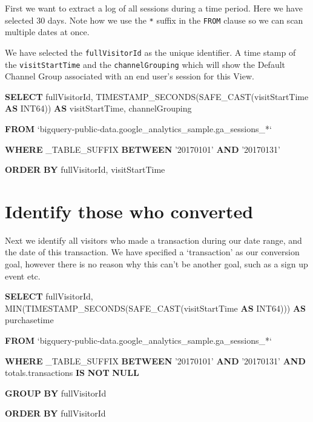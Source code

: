 \documentclass[]{book}
\newenvironment{Shaded}{\begin{snugshade}}{\end{snugshade}}
\newcommand{\FunctionTok}[1]{\textcolor[rgb]{0.00,0.00,0.00}{#1}}
\newcommand{\KeywordTok}[1]{\textcolor[rgb]{0.13,0.29,0.53}{\textbf{#1}}}
\newcommand{\NormalTok}[1]{#1}
\newcommand{\StringTok}[1]{\textcolor[rgb]{0.31,0.60,0.02}{#1}}
\begin{document}
First we want to extract a log of all sessions during a time period. Here we have
selected 30 days. Note how we use the \texttt{*} suffix in the \texttt{FROM} clause so we
can scan multiple dates at once.

We have selected the \texttt{fullVisitorId} as the unique identifier. A time stamp
of the \texttt{visitStartTime} and the \texttt{channelGrouping} which will show the Default Channel
Group associated with an end user's session for this View.

\begin{Shaded}
\begin{Highlighting}[]
   \KeywordTok{SELECT}\NormalTok{ fullVisitorId, }
\NormalTok{          TIMESTAMP_SECONDS(SAFE_CAST(visitStartTime }\KeywordTok{AS}\NormalTok{ INT64))  }\KeywordTok{AS}\NormalTok{ visitStartTime,  }
\NormalTok{          channelGrouping}

    \KeywordTok{FROM}\NormalTok{ `bigquery-public-data.google_analytics_sample.ga_sessions_*`}

    \KeywordTok{WHERE}\NormalTok{ _TABLE_SUFFIX }\KeywordTok{BETWEEN} \StringTok{'20170101'} \KeywordTok{AND} \StringTok{'20170131'}

    \KeywordTok{ORDER} \KeywordTok{BY}\NormalTok{ fullVisitorId, visitStartTime}
\end{Highlighting}
\end{Shaded}

\hypertarget{identify-those-who-converted}{%
\section{Identify those who converted}\label{identify-those-who-converted}}

Next we identify all visitors who made a transaction during our date range, and
the date of this transaction. We have specified a `transaction' as our conversion
goal, however there is no reason why this can't be another goal, such as a sign
up event etc.

\begin{Shaded}
\begin{Highlighting}[]
    \KeywordTok{SELECT}\NormalTok{ fullVisitorId, }
           \FunctionTok{MIN}\NormalTok{(TIMESTAMP_SECONDS(SAFE_CAST(visitStartTime }\KeywordTok{AS}\NormalTok{ INT64)))  }\KeywordTok{AS}\NormalTok{ purchasetime}

    \KeywordTok{FROM}\NormalTok{ `bigquery-public-data.google_analytics_sample.ga_sessions_*`}

    \KeywordTok{WHERE}\NormalTok{ _TABLE_SUFFIX }\KeywordTok{BETWEEN} \StringTok{'20170101'} \KeywordTok{AND} \StringTok{'20170131'}
     \KeywordTok{AND}\NormalTok{ totals.transactions }\KeywordTok{IS} \KeywordTok{NOT} \KeywordTok{NULL}

    \KeywordTok{GROUP} \KeywordTok{BY}\NormalTok{ fullVisitorId}

    \KeywordTok{ORDER} \KeywordTok{BY}\NormalTok{ fullVisitorId}
\end{Highlighting}
\end{Shaded}
\end{document}
